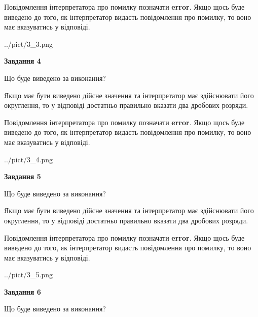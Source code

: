 \documentclass[12pt, ukrainian]{article}
\begin{document}
{\begin {Large}
Повідомлення інтерпретатора про помилку позначати \textbf{error}.
Якщо щось буде виведено до того, як інтерпретатор видасть повідомлення про помилку, 
то воно має вказуватись у відповіді. \par

\begin{center}
	{../pict/3_3.png}
\end{center}
\newpage

{\begin {center}\textbf{Завдання 4}\end {center}}\par
Що буде виведено за виконання? \par

Якщо має бути виведено дійсне значення та інтерпретатор має здійснювати його округлення, 
то у відповіді достатньо правильно вказати два дробових розряди.

Повідомлення інтерпретатора про помилку позначати \textbf{error}.
Якщо щось буде виведено до того, як інтерпретатор видасть повідомлення про помилку, 
то воно має вказуватись у відповіді. \par

\begin{center}
	{../pict/3_4.png}
\end{center}
\newpage

{\begin {center}\textbf{Завдання 5}\end {center}}\par
Що буде виведено за виконання? \par

Якщо має бути виведено дійсне значення та інтерпретатор має здійснювати його округлення, 
то у відповіді достатньо правильно вказати два дробових розряди.

Повідомлення інтерпретатора про помилку позначати \textbf{error}.
Якщо щось буде виведено до того, як інтерпретатор видасть повідомлення про помилку, 
то воно має вказуватись у відповіді. \par

\begin{center}
	{../pict/3_5.png}
\end{center}
\newpage

{\begin {center}\textbf{Завдання 6}\end {center}}\par
Що буде виведено за виконання? \par


\end{Large}}
\end{document}
